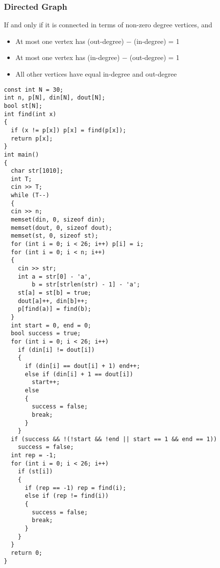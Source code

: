 \subsubsection{Directed Graph}
If and only if it is connected in terms of non-zero degree vertices, and
\begin{itemize}
  \item At most one vertex has (out-degree) − (in-degree) = 1
  \item At most one vertex has (in-degree) − (out-degree) = 1
  \item All other vertices have equal in-degree and out-degree
\end{itemize}
\begin{lstlisting}
const int N = 30;
int n, p[N], din[N], dout[N];
bool st[N];
int find(int x)
{
  if (x != p[x]) p[x] = find(p[x]);
  return p[x];
}
int main()
{
  char str[1010];
  int T;
  cin >> T;
  while (T--)
  {
  cin >> n;
  memset(din, 0, sizeof din);
  memset(dout, 0, sizeof dout);
  memset(st, 0, sizeof st);
  for (int i = 0; i < 26; i++) p[i] = i;
  for (int i = 0; i < n; i++)
  {
    cin >> str;
    int a = str[0] - 'a', 
        b = str[strlen(str) - 1] - 'a';
    st[a] = st[b] = true;
    dout[a]++, din[b]++;
    p[find(a)] = find(b);
  }
  int start = 0, end = 0;
  bool success = true;
  for (int i = 0; i < 26; i++)
    if (din[i] != dout[i])
    {
      if (din[i] == dout[i] + 1) end++;
      else if (din[i] + 1 == dout[i])
        start++;
      else
      {
        success = false;
        break;
      }
    }
  if (success && !(!start && !end || start == 1 && end == 1))
    success = false;
  int rep = -1;
  for (int i = 0; i < 26; i++)
    if (st[i])
    {
      if (rep == -1) rep = find(i);
      else if (rep != find(i))
      {
        success = false;
        break;
      }
    }
  }
  return 0;
}
\end{lstlisting}
